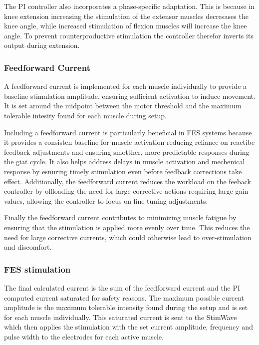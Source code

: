 The PI controller also incorporates a phase-specific adaptation. This is because in knee extension increasing the stimulation of the extensor muscles decresases the knee angle, while increased stimulation of flexion muscles will increase the knee angle. To prevent counterproductive stimulation the controller therefor inverts its output during extension.


\subsubsection{Feedforward Current}
A feedforward current is implemented for each muscle individually to provide a baseline stimulation amplitude, ensuring sufficient activation to induce movement. It is set around the midpoint between the motor threshold and the maximum tolerable intesity found for each muscle during setup. 


Including a feedforward current is particularly beneficial in FES systems because it provides a consisten baseline for muscle activation reducing reliance on reactibe feedback adjustments and ensuring smotther, more predictable responses during the giat cycle. It also helps address delays in muscle activation and mechenical response by esnuring timely stimulation even before feedback corrections take effect. Additionally, the feedforward current reduces the workload on the feeback controller by offloading the need for large corrective actions requiring large gain values, allowing the controller to focus on fine-tuning adjustments.

Finally the feedforward current contributes to minimizing muscle fatigue by ensuring that the stimulation is applied more evenly over time. This reduces the need for large corrective currents, which could otherwise lead to over-stimulation and discomfort.


\subsubsection{FES stimulation}
The final calculated current is the sum of the feedforward current and the PI computed current saturated for safety reasons. The maximum possible current amplitude is the maximum tolerable intensity found during the setup and is set for each muscle individually. This saturated current is sent to the StimWave which then applies the stimulation with the set current amplitude, frequency and pulse width to the electrodes for each active muscle.


























